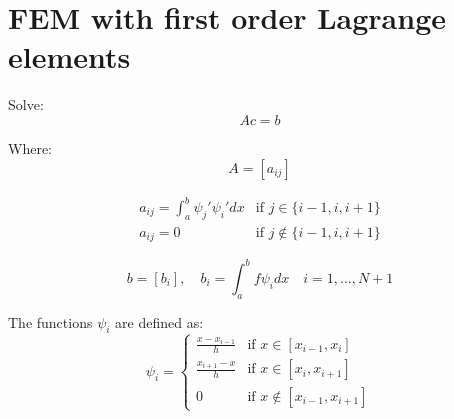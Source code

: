 \documentclass{article}
\begin{document}
\section{FEM with first order Lagrange elements}
\noindent Solve:
\begin{equation*}
    Ac=b
\end{equation*}

\noindent Where:
\begin{equation*}
    A=[a_{ij}]
\end{equation*}

\[
\begin{array}{cc}
     a_{ij}=\int_a^b \psi_j' \psi_i' dx&\text{if } j\in\{ i-1,i,i+1\}  \\
     a_{ij}=0&\text{if } j\notin\{ i-1,i,i+1\} 
\end{array}
\]

\begin{equation*}
    b=[b_i], \quad b_{i}=\int_a^b f \psi_i dx \quad i=1,...,N+1
\end{equation*}

\noindent The functions $\psi_i$ are defined as:
\[\psi_i= \left\{
\begin{array}{rcl}
\frac{x-x_{i-1}}{h}& \text{if } x\in [x_{i-1}, x_i]\\
\frac{x_{i+1}-x}{h}& \text{if } x\in [x_{i}, x_{i+1}]\\
0& \text{if } x\notin [x_{i-1}, x_{i+1}]
\end{array}\right.\]
\end{document}
